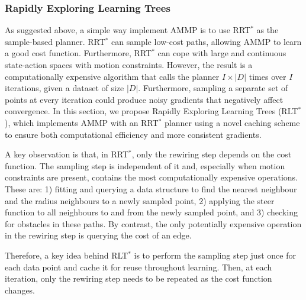 \documentclass[a4paper,11pt]{report}
\begin{document}
\subsubsection{Rapidly Exploring Learning Trees \label{subsec:cached}}

As suggested above, a simple way implement AMMP is to use RRT$^*$ as the sample-based planner.  RRT$^*$ can sample low-cost paths, allowing AMMP to learn a good cost function. Furthermore, RRT$^*$ can cope with large and continuous state-action spaces with motion constraints. However, the result is a computationally expensive algorithm that calls the planner $I\times|D|$ times over $I$ iterations, given a dataset of size $|D|$. Furthermore, sampling a separate set of points at every iteration could produce noisy gradients that negatively affect convergence. In this section, we propose Rapidly Exploring Learning Trees (RLT$^*$), which implements AMMP with an RRT$^*$ planner using a novel caching scheme to ensure both computational efficiency and more consistent gradients.

A key observation is that, in RRT$^*$, only the rewiring step depends on the cost function.  The sampling step is independent of it and, especially when motion constraints are present, contains the most computationally expensive operations. These are: 1) fitting and querying a data structure to find the nearest neighbour and the radius neighbours to a newly sampled point, 2) applying the steer function to all neighbours to and from the newly sampled point, and 3) checking for obstacles in these paths. By contrast,  the only potentially expensive operation in the rewiring step is querying the cost of an edge. 

Therefore, a key idea behind RLT$^*$ is to perform the sampling step just once for each data point and cache it for reuse throughout learning. Then, at each iteration, only the rewiring step needs to be repeated as the cost function changes.
\end{document}
